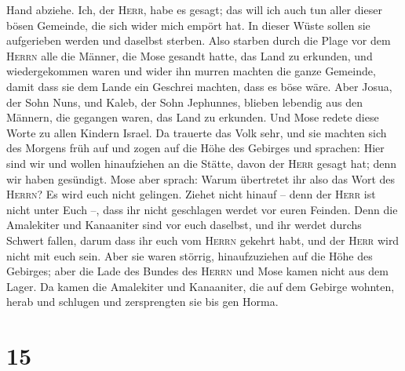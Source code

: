 Hand abziehe.  Ich, der \textsc{Herr}, habe es gesagt;
das will ich auch tun aller dieser bösen Gemeinde, die sich wider mich
empört hat. In dieser Wüste sollen sie aufgerieben werden und daselbst
sterben.  Also starben durch die Plage vor dem
\textsc{Herrn} alle die Männer, die Mose gesandt hatte, das Land zu
erkunden, und wiedergekommen waren und wider ihn murren machten die
ganze Gemeinde,  damit dass sie dem Lande ein Geschrei
machten, dass es böse wäre.  Aber Josua, der Sohn Nuns,
und Kaleb, der Sohn Jephunnes, blieben lebendig aus den Männern, die
gegangen waren, das Land zu erkunden.  Und Mose redete
diese Worte zu allen Kindern Israel. Da trauerte das Volk sehr,
 und sie machten sich des Morgens früh auf und zogen auf
die Höhe des Gebirges und sprachen: Hier sind wir und wollen
hinaufziehen an die Stätte, davon der \textsc{Herr} gesagt hat; denn wir
haben gesündigt.  Mose aber sprach: Warum übertretet ihr
also das Wort des \textsc{Herrn}? Es wird euch nicht gelingen.
 Ziehet nicht hinauf -- denn der \textsc{Herr} ist nicht
unter Euch --, dass ihr nicht geschlagen werdet vor euren Feinden.
 Denn die Amalekiter und Kanaaniter sind vor euch
daselbst, und ihr werdet durchs Schwert fallen, darum dass ihr euch vom
\textsc{Herrn} gekehrt habt, und der \textsc{Herr} wird nicht mit euch
sein.  Aber sie waren störrig, hinaufzuziehen auf die
Höhe des Gebirges; aber die Lade des Bundes des \textsc{Herrn} und Mose
kamen nicht aus dem Lager.  Da kamen die Amalekiter und
Kanaaniter, die auf dem Gebirge wohnten, herab und schlugen und
zersprengten sie bis gen Horma.

\hypertarget{section-14}{%
\section{15}\label{section-14}}

